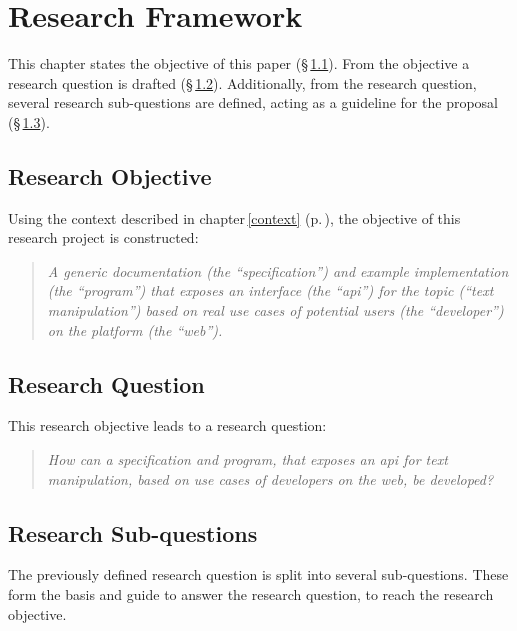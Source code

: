 \chapter{Research Framework}\label{research-framework}

This chapter states the objective of this paper (§\,\ref{research-objective}).
From the objective a research question is drafted
  (§\,\ref{research-question}).
Additionally, from the research question, several research sub-questions are
  defined, acting as a guideline for the proposal
  (§\,\ref{research-sub-questions}).

\section{Research Objective}\label{research-objective}

Using the context described in chapter\,\ref{context} (p.\,\pageref{context}),
  the objective of this research project is constructed:

\begin{quote}
  \textit{A generic documentation (the ``specification'') and example
    implementation (the ``program'') that exposes an interface (the
    ``\acrshort{api}'') for the topic (``text manipulation'') based on real
    use cases of potential users (the ``developer'') on the platform (the
    ``web'').
  }
\end{quote}

\section{Research Question}\label{research-question}

This research objective leads to a research question:

\begin{quote}
  \textit{How can a specification and program, that exposes an \acrshort{api}
    for text manipulation, based on use cases of developers on the web,
    be developed?
  }
\end{quote}

\section{Research Sub-questions}\label{research-sub-questions}

The previously defined research question is split into several sub-questions.
These form the basis and guide to answer the research question, to reach
  the research objective.

